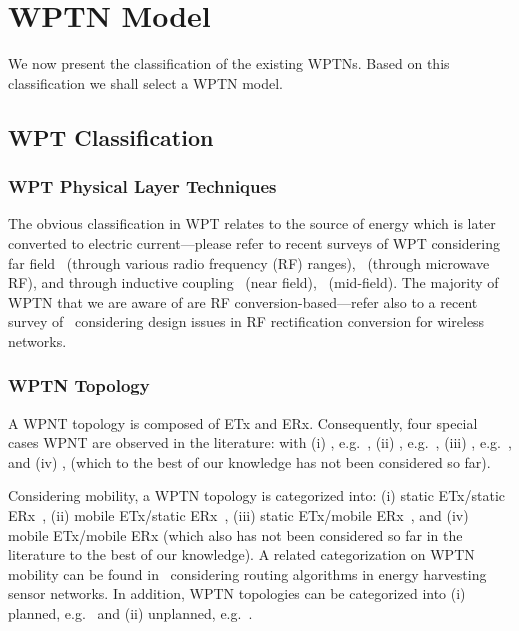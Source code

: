 \documentclass[11pt,draftclsnofoot,journal,onecolumn]{IEEEtran}
\begin{document}
\section{WPTN Model}
\label{sec:wptn_model}

We now present the classification of the existing WPTNs. Based on this classification we shall select a WPTN model.

\subsection{WPT Classification}
\label{sec:wpt_classification}

\subsubsection{WPT Physical Layer Techniques}

The obvious classification in WPT relates to the source of energy which is later converted to electric current---please refer to recent surveys of WPT considering far field~\cite{visser_procieee_2013} (through various radio frequency (RF) ranges),~\cite{strassner_procieee_2013} (through microwave RF), and through inductive coupling~\cite{sample_procieee_2013} (near field),~\cite{ho_procieee_2013} (mid-field). The majority of WPTN that we are aware of are RF conversion-based---refer also to a recent survey of~\cite{lu_arxiv_2014,lu:2014:arxiv} considering design issues in RF rectification conversion for wireless networks.

\subsubsection{WPTN Topology}

A WPNT topology is composed of  ETx and  ERx. Consequently, four special cases WPNT are observed in the literature: with (i) ,  e.g.~\cite{ju_twc_2014,zhao_tmc_2014}, (ii) ,  e.g.~\cite{timotheou_twc_2014,naderi_twc_2014}, (iii) ,  e.g.~\cite{liu_net_2014,yang_arxiv_2013}, and (iv) ,  (which to the best of our knowledge has not been considered so far).

Considering mobility, a WPTN topology is categorized into: (i) static ETx/static ERx~\cite{liu_net_2014,naderi_twc_2014}, (ii) mobile ETx/static ERx~\cite{zhao_tmc_2014,wang_tmc_2014}, (iii) static ETx/mobile ERx~\cite{dai_tpds_2014,he_tmc_2013,mercier_jssc_2011}, and (iv) mobile ETx/mobile ERx (which also has not been considered so far in the literature to the best of our knowledge). A related categorization on WPTN mobility can be found in~\cite[Table IX]{lu_arxiv_2014} considering routing algorithms in energy harvesting sensor networks. In addition, WPTN topologies can be categorized into (i) planned, e.g.~\cite{timotheou_twc_2014,ju_twc_2014,zhao_tmc_2014,liu_net_2014} and (ii) unplanned, e.g.~\cite{krikidis_tcom_2013}.
\end{document}
